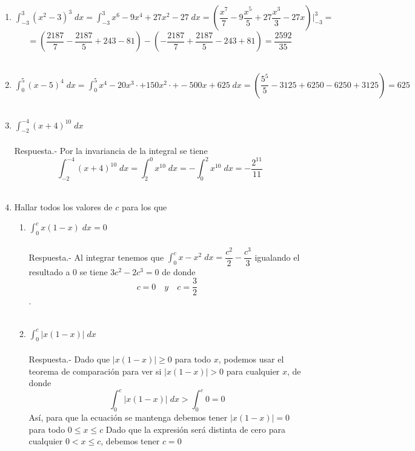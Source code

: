 \begin{enumerate}
    \item $\displaystyle\int_{-3}^3 (x^2-3)^3 \; dx = \int_{-3}^3 x^6 - 9x^4 + 27x^2 - 27 \; dx = \left(\dfrac{x^7}{7}-9\dfrac{x^5}{5}+27\dfrac{x^3}{3}-27x\right)\bigg|_{-3}^3 =$
	$$=\left(\dfrac{2187}{7}-\dfrac{2187}{5}+243-81\right)-\left(-\dfrac{2187}{7}+\dfrac{2187}{5}-243+81\right)=\dfrac{2592}{35}$$\\


    \item $\displaystyle\int_0^5 (x-5)^4 \; dx = \int_0^5 x^4 - 20x^3\cdot + 150 x^2\cdot + - 500x + 625 \; dx = \left(\dfrac{5^5}{5} - 3125 + 6250 - 6250 + 3125 \right) = 625$\\\\

    \item $\displaystyle\int_{-2}^{-4} (x + 4)^{10} \; dx$\\\\
	Respuesta.-\; Por la invariancia de la integral se tiene 
	$$\int_{-2}^{-4} (x+4)^{10} \; dx = \int_2^0 x^{10} \; dx = - \int_0^2 x^{10} \; dx = - \dfrac{2^{11}}{11}$$\\

    \item Hallar todos los valores de $c$ para los que

    \begin{enumerate}[\bfseries (a)]

	\item $\displaystyle\int_0^c x(1-x) \; dx = 0$\\\\
	    Respuesta.-\; Al integrar tenemos que $\displaystyle\int_0^c x - x^2 \; dx = \dfrac{c^2}{2} - \dfrac{c^3}{3}$ igualando el resultado a $0$ se tiene $3c^2 - 2c^3 = 0$ de donde $$c=0 \quad y \quad c=\dfrac{3}{2}$$.\\\\

	\item $\displaystyle\int_0^c |x(1-x)| \; dx$\\\\
	    Respuesta.-\; Dado que $|x(1-x)|\geq 0$ para todo $x$, podemos usar el teorema de comparación para ver si $|x(1-x)|>0$ para cualquier $x$, de donde $$\int_0^c |x(1-x)| \; dx > \int_0^c 0 = 0$$
	    Así, para que la ecuación se mantenga debemos tener $|x(1-x)|=0$ para todo $0\leq x \leq c$ Dado que la expresión será distinta de cero para cualquier $0<x\leq c$, debemos tener $c=0$\\\\\\\\
    \end{enumerate}


\end{enumerate}
